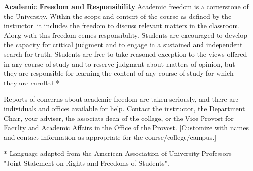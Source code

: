 \documentclass[11pt]{article}
\begin{document}
\vspace{10pt}
\noindent\textbf{Academic Freedom and Responsibility}
Academic freedom is a cornerstone of the University. Within the scope and content of the course as defined by the instructor, it includes the freedom to discuss relevant matters in the classroom. Along with this freedom comes responsibility. Students are encouraged to develop the capacity for critical judgment and to engage in a sustained and independent search for truth. Students are free to take reasoned exception to the views offered in any course of study and to reserve judgment about matters of opinion, but they are responsible for learning the content of any course of study for which they are enrolled.*

Reports of concerns about academic freedom are taken seriously, and there are individuals and offices available for help. Contact the instructor, the Department Chair, your adviser, the associate dean of the college, or the Vice Provost for Faculty and Academic Affairs in the Office of the Provost. [Customize with names and contact information as appropriate for the course/college/campus.]

* Language adapted from the American Association of University Professors "Joint Statement on Rights and Freedoms of Students".

\newpage
\end{document}
